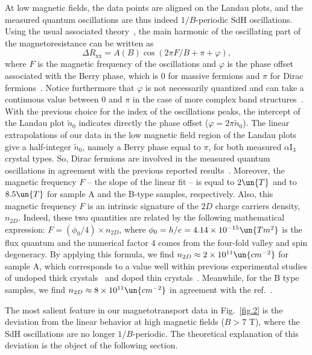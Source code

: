 \documentclass[doublecol]{epl2}
\begin{document}
At low magnetic fields, the data points are aligned on the Landau plots, and the measured quantum oscillations are thus indeed $1/B$-periodic SdH oscillations. 
Using the usual associated theory~\cite{Shoenberg}, the main harmonic of the oscillating part of the magnetoresistance can be written as 
\begin{equation}
\label{SdHTheory}
\Delta R_{\mathrm{xx}} = A(B) \cos\left(2\pi F/B+\pi +\varphi\right),
\end{equation} 
where $F$ is the magnetic frequency of the oscillations and $\varphi$ is the phase offset associated with the Berry phase, which is $0$ for massive 
fermions and $\pi$ for Dirac 
fermions~\cite{Coleridge,graphene2}. Notice furthermore that $\varphi$ is not necessarily quantized and can take a continuous value between $0$ and 
$\pi$ in the case of more complex band structures~\cite{TopolInsulatorsMcKenzie,MarkPhaseBerryContinuous}. With the previous choice for the index of the 
oscillations peaks, the intercept of the Landau plot $\tilde{n}_{0}$ indicates directly the phase offset %
($\varphi=2\pi\tilde{n}_{0}$). The linear 
extrapolations of our data in the low magnetic field region of the Landau plots give a half-integer $\tilde{n}_{0}$, namely a Berry phase equal to $\pi$, for both 
measured $\alpha$I$_{3}$ crystal types. So, Dirac fermions are involved in the measured quantum oscillations in agreement with the previous reported 
results~\cite{alphaSdHOscillations}. Moreover, the magnetic frequency $F$ -- the slope of the linear fit -- is equal to $2\un{T}$ and to $8.5\un{T}$ for sample 
A and the B-type samples, respectively. Also, this magnetic frequency $F$ is an intrinsic signature of the $2D$ charge carriers density, $n_{2D}$. Indeed, these two 
quantities are related by the following mathematical expression: $F=\left(\phi_{0}/4\right)\times n_{2D}$, where $\phi_{0}=h/e=4.14\times 10^{-15}\un{T m^2}$ is the flux 
quantum and the numerical factor $4$ comes from the four-fold valley and spin degeneracy. By applying this formula, we find $n_{2D}\approx 2\times 10^{11}\un{cm^ {-2}}$ 
for sample A, which corresponds to a value well within previous experimental studies of undoped thick crystals~\cite{alpha3,alphaCoexistenceExp} and doped thin 
crystals~\cite{alphaSdHOscillations}. Meanwhile, for the B type samples, we find $n_{2D}\approx 8\times 10^{11}\un{cm^ {-2}}$ in agreement with the ref.~\cite{alphaSdHOscillations}.

The most salient feature in our magnetotransport data in Fig.~\ref{fig.2} is the deviation from the linear behavior at high magnetic fields ($B> 7$ T), 
where the SdH oscillations are no longer $1/B$-periodic. The theoretical explanation of this deviation is the object of the following section. 
\end{document}
